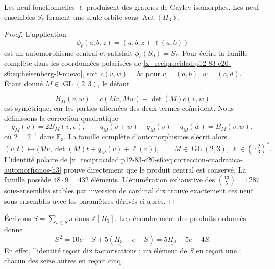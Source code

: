 \begin{theorem}
\label{x_reciprocidad:p12-83-c20-s6:thm:independencia-calibre-e6}
Les neuf fonctionnelles \(\ell\) produisent des graphes de Cayley isomorphes. Les
neuf ensembles \(S_\ell\) forment une seule orbite sous
\(\operatorname{Aut}(H_3)\).
\end{theorem}

\begin{proof}
L'application
\[
 \phi_\ell(a,b,z)=(a,b,z+\ell(a,b))
\]
est un automorphisme central et satisfait
\(\phi_\ell(S_0)=S_\ell\). Pour écrire la famille complète dans les
coordonnées polarisées de \cref{x_reciprocidad:p12-83-c20-s6:eq:heisenberg-9-nuevo}, soit
\(c(v,w)=b c\) pour \(v=(a,b)\), \(w=(c,d)\). Étant donné
\(M\in\operatorname{GL}(2,3)\), le défaut

\[
 B_M(v,w)=c(Mv,Mw)-\det(M)c(v,w)
\]
est symétrique, car les parties alternées des deux termes coïncident. Nous définissons la correction quadratique
\begin{equation}
 q_M(v)=2B_M(v,v),
 \qquad
 q_M(v+w)-q_M(v)-q_M(w)=B_M(v,w),
 \label{x_reciprocidad:p12-83-c20-s6:eq:correccion-cuadratica-automorfismos-h3}
\end{equation}
où \(2=2^{-1}\) dans \(\mathbb F_3\). La famille complète d'automorphismes s'écrit alors
\begin{equation}
 (v,t)\longmapsto
 \bigl(Mv,\det(M)t+q_M(v)+\ell(v)\bigr),
 \qquad M\in\operatorname{GL}(2,3),\
 \ell\in(\mathbb F_3^2)^*.
 \label{x_reciprocidad:p12-83-c20-s6:eq:automorfismos-h3-completos}
\end{equation}
L’identité polaire de \cref{x_reciprocidad:p12-83-c20-s6:eq:correccion-cuadratica-automorfismos-h3}
prouve directement que le produit central est conservé. La famille possède
\(48\cdot9=432\) éléments. L’énumération exhaustive des
\(\binom{13}{5}=1287\) sous-ensembles stables par inversion de cardinal dix
trouve exactement ces neuf sous-ensembles avec les paramètres dérivés
ci-après.
\end{proof}

Écrivons \(\underline S=\sum_{s\in S}s\) dans
\(\mathbb Z[H_3]\). Le dénombrement des produits ordonnés donne
\begin{equation}
 \underline S^{\,2}
 =10e+\underline S+5(\underline{H_3}-e-\underline S)
 =5\underline{H_3}+5e-4\underline S.
 \label{x_reciprocidad:p12-83-c20-s6:eq:identidad-grupo-schlafli-nueva}
\end{equation}
En effet, l'identité reçoit dix factorisations ; un élément de \(S\) en reçoit une ; chacun des seize autres en reçoit cinq.

